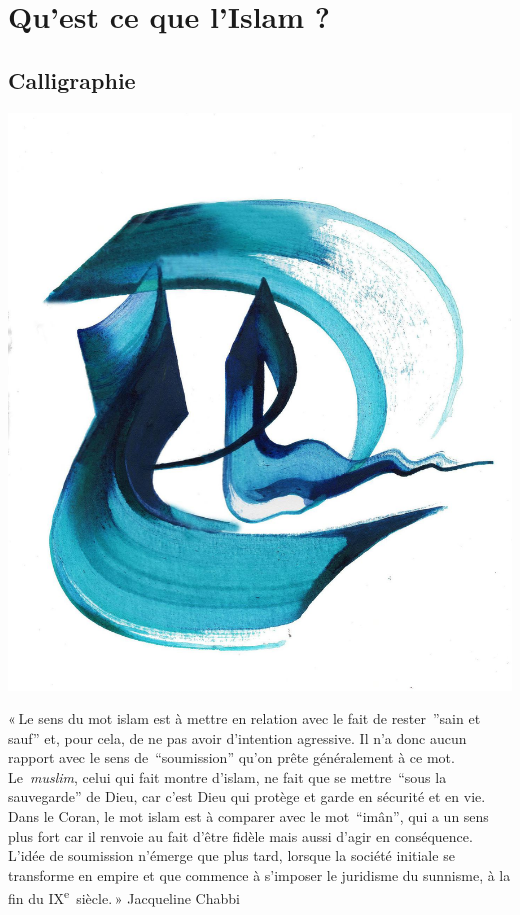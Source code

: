 \chapter{Qu'est ce que l'Islam ?}

\section{Calligraphie}

\includegraphics[width=\textwidth]{Images/image011.png}

« Le sens du mot islam est à mettre en relation avec le fait de
rester~''sain et sauf'' et, pour cela, de ne pas avoir d'intention
agressive. Il n'a donc aucun rapport avec le sens de~``soumission''
qu'on prête généralement à ce mot. Le~\emph{muslim}, celui qui fait
montre d'islam, ne fait que se mettre~``sous la sauvegarde'' de Dieu,
car c'est Dieu qui protège et garde en sécurité et en vie. Dans le
Coran, le mot islam est à comparer avec le mot~``imân'', qui a un sens
plus fort car il renvoie au fait d'être fidèle mais aussi d'agir en
conséquence. L'idée de soumission n'émerge que plus tard, lorsque la
société initiale se transforme en empire et que commence à s'imposer le
juridisme du sunnisme, à la fin du IX\textsuperscript{e}~siècle. » Jacqueline Chabbi



